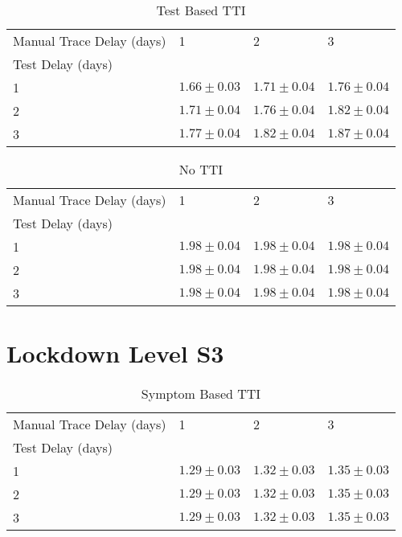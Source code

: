 \documentclass{article}
\begin{document}
    \begin{table}[H]
         \begin{tabular}{llll}
\toprule
Manual Trace Delay (days) &                1 &                2 &                3 \\
Test Delay (days) &                  &                  &                  \\
\midrule
1                 &  $1.66 \pm 0.03$ &  $1.71 \pm 0.04$ &  $1.76 \pm 0.04$ \\
2                 &  $1.71 \pm 0.04$ &  $1.76 \pm 0.04$ &  $1.82 \pm 0.04$ \\
3                 &  $1.77 \pm 0.04$ &  $1.82 \pm 0.04$ &  $1.87 \pm 0.04$ \\
\bottomrule
\end{tabular}

        \caption{Test Based TTI}
    \end{table}
    


    \begin{table}[H]
         \begin{tabular}{llll}
\toprule
Manual Trace Delay (days) &                1 &                2 &                3 \\
Test Delay (days) &                  &                  &                  \\
\midrule
1                 &  $1.98 \pm 0.04$ &  $1.98 \pm 0.04$ &  $1.98 \pm 0.04$ \\
2                 &  $1.98 \pm 0.04$ &  $1.98 \pm 0.04$ &  $1.98 \pm 0.04$ \\
3                 &  $1.98 \pm 0.04$ &  $1.98 \pm 0.04$ &  $1.98 \pm 0.04$ \\
\bottomrule
\end{tabular}

        \caption{No TTI}
    \end{table}
    

\clearpage

\section{Lockdown Level S3}


    \begin{table}[H]
         \begin{tabular}{llll}
\toprule
Manual Trace Delay (days) &                1 &                2 &                3 \\
Test Delay (days) &                  &                  &                  \\
\midrule
1                 &  $1.29 \pm 0.03$ &  $1.32 \pm 0.03$ &  $1.35 \pm 0.03$ \\
2                 &  $1.29 \pm 0.03$ &  $1.32 \pm 0.03$ &  $1.35 \pm 0.03$ \\
3                 &  $1.29 \pm 0.03$ &  $1.32 \pm 0.03$ &  $1.35 \pm 0.03$ \\
\bottomrule
\end{tabular}

        \caption{Symptom Based TTI}
    \end{table}
    
\end{document}
